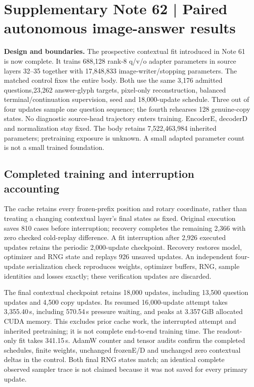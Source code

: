 \clearpage
\section*{Supplementary Note 62 | Paired autonomous image-answer results}

\textbf{Design and boundaries.}
The prospective contextual fit introduced in Note 61 is now complete. It
trains 688,128 rank-8 q/v/o adapter parameters in source layers 32--35 together
with 17,848,833 image-writer/stopping parameters. The matched control fixes the
entire body. Both use the same 3,176 admitted questions,23,262 answer-glyph
targets, pixel-only reconstruction, balanced terminal/continuation supervision,
seed and 18,000-update schedule. Three out of four updates sample one question
sequence; the fourth rehearses 128 genuine-copy states. No diagnostic source-head
trajectory enters training. EncoderE, decoderD and normalization stay fixed.
The body retains 7,522,463,984 inherited parameters; pretraining exposure is
unknown. A small adapted parameter count is not a small trained foundation.

\subsection*{Completed training and interruption accounting}
The cache retains every frozen-prefix position and rotary coordinate, rather
than treating a changing contextual layer's final states as fixed. Original
execution saves 810 cases before interruption; recovery completes the remaining
2,366 with zero checked cold-replay difference. A fit interruption after 2,926
executed updates retains the periodic 2,000-update checkpoint. Recovery restores
model, optimizer and RNG state and replays 926 unsaved updates. An independent
four-update serialization check reproduces weights, optimizer buffers, RNG,
sample identities and losses exactly; these verification updates are discarded.

The final contextual checkpoint retains 18,000 updates, including 13,500
question updates and 4,500 copy updates. Its resumed 16,000-update attempt takes
3,355.40\,s, including 570.54\,s pressure waiting, and peaks at 3.357\,GiB allocated
CUDA memory. This excludes prior cache work, the interrupted attempt and
inherited pretraining; it is not complete end-to-end training time. The
readout-only fit takes 341.15\,s. AdamW counter and tensor audits confirm the
completed schedules, finite weights, unchanged frozenE/D and unchanged zero
contextual deltas in the control. Both final RNG states match; an identical
complete observed sampler trace is not claimed because it was not saved for
every primary update.

